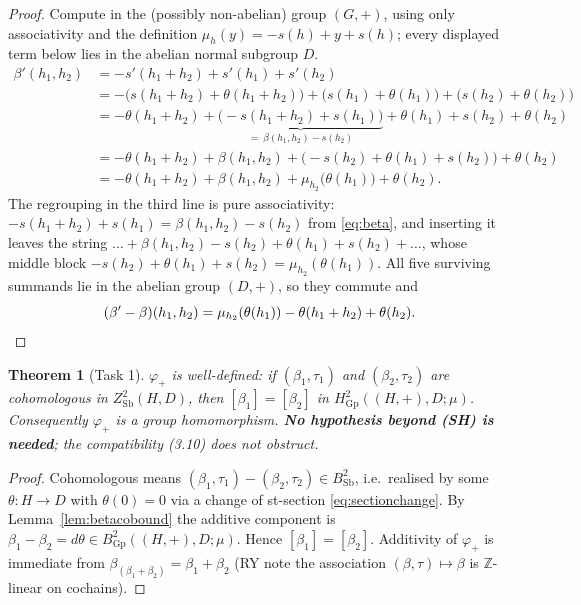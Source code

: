 \documentclass[11pt]{article}
\newtheorem{theorem}{Theorem}
\theoremstyle{definition}
\newcommand{\Sb}{\mathrm{Sb}}
\newcommand{\Gp}{\mathrm{Gp}}
\newcommand{\Z}{\mathbb{Z}}
\begin{document}
\begin{proof}
Compute in the (possibly non-abelian) group $(G,+)$, using only associativity and the
definition $\mu_h(y)=-s(h)+y+s(h)$; every displayed term below lies in the abelian normal
subgroup $D$.
\begin{align*}
\beta'(h_1,h_2)
&=-s'(h_1+h_2)+s'(h_1)+s'(h_2)\\
&=-\bigl(s(h_1{+}h_2)+\theta(h_1{+}h_2)\bigr)+\bigl(s(h_1)+\theta(h_1)\bigr)+\bigl(s(h_2)+\theta(h_2)\bigr)\\
&=-\theta(h_1{+}h_2)+\underbrace{\bigl(-s(h_1{+}h_2)+s(h_1)\bigr)}_{=\ \beta(h_1,h_2)-s(h_2)}
   +\theta(h_1)+s(h_2)+\theta(h_2)\\
&=-\theta(h_1{+}h_2)+\beta(h_1,h_2)+\bigl(-s(h_2)+\theta(h_1)+s(h_2)\bigr)+\theta(h_2)\\
&=-\theta(h_1{+}h_2)+\beta(h_1,h_2)+\mu_{h_2}\bigl(\theta(h_1)\bigr)+\theta(h_2).
\end{align*}
The regrouping in the third line is pure associativity: $-s(h_1{+}h_2)+s(h_1)=\beta(h_1,h_2)-s(h_2)$
from \eqref{eq:beta}, and inserting it leaves the string
$\dots+\beta(h_1,h_2)-s(h_2)+\theta(h_1)+s(h_2)+\dots$, whose middle block
$-s(h_2)+\theta(h_1)+s(h_2)=\mu_{h_2}(\theta(h_1))$. All five surviving summands lie in the
abelian group $(D,+)$, so they commute and
\[
(\beta'-\beta)(h_1,h_2)=\mu_{h_2}(\theta(h_1))-\theta(h_1+h_2)+\theta(h_2). \qedhere
\]
\end{proof}

\begin{theorem}[Task 1]\label{thm:phiplus}
$\varphi_+$ is well-defined: if $(\beta_1,\tau_1)$ and $(\beta_2,\tau_2)$ are cohomologous in
$Z^2_\Sb(H,D)$, then $[\beta_1]=[\beta_2]$ in $H^2_\Gp((H,+),D;\mu)$. Consequently
$\varphi_+$ is a group homomorphism. \textbf{No hypothesis beyond {\rm(SH)} is needed}; the
compatibility (3.10) does not obstruct.
\end{theorem}

\begin{proof}
Cohomologous means $(\beta_1,\tau_1)-(\beta_2,\tau_2)\in B^2_\Sb$, i.e.\ realised by some
$\theta:H\to D$ with $\theta(0)=0$ via a change of st-section \eqref{eq:sectionchange}. By
Lemma~\ref{lem:betacobound} the additive component is $\beta_1-\beta_2=d\theta\in
B^2_\Gp((H,+),D;\mu)$. Hence $[\beta_1]=[\beta_2]$. Additivity of $\varphi_+$ is immediate from
$\beta_{(\beta_1+\beta_2)}=\beta_1+\beta_2$ (RY note the association $(\beta,\tau)\mapsto\beta$
is $\Z$-linear on cochains).
\end{proof}
\end{document}
